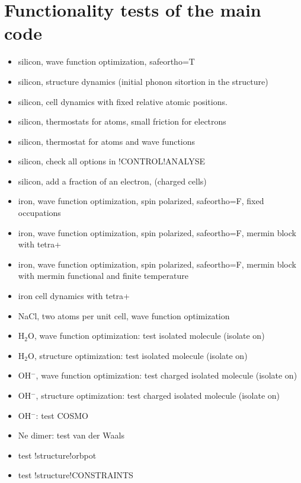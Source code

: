 \documentclass[11pt,a4paper]{report}
\begin{document}
\section{Functionality tests of the main code}
\begin{itemize}
\item silicon, wave function optimization, safeortho=T
\item silicon, structure dynamics (initial phonon sitortion in the
  structure)
\item silicon, cell dynamics with fixed relative atomic positions.
\item silicon, thermostats for atoms, small friction for electrons
\item silicon, thermostat for atoms and wave functions
\item silicon, check all options in !CONTROL!ANALYSE
\item silicon, add a fraction of an electron, (charged cells)
\item iron, wave function optimization, spin polarized, safeortho=F,
  fixed occupations
\item iron, wave function optimization, spin polarized, safeortho=F,
  mermin block with tetra+
\item iron, wave function optimization, spin polarized, safeortho=F,
  mermin block with mermin functional and finite temperature
\item iron cell dynamics with tetra+
\item NaCl, two atoms per unit cell, wave function optimization
\item H$_2$O, wave function optimization: test isolated molecule
  (isolate on)
\item H$_2$O, structure optimization: test isolated molecule (isolate
  on)
\item OH$^-$, wave function optimization: test charged isolated
  molecule (isolate on)
\item OH$^-$, structure optimization: test charged isolated molecule
  (isolate on)
\item OH$^-$: test COSMO
\item Ne dimer: test van der Waals
\item test !structure!orbpot
\item test !structure!CONSTRAINTS
\end{itemize}

\end{document}
